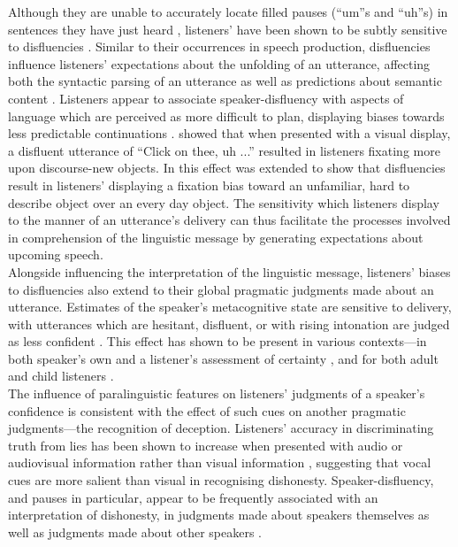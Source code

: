 \documentclass[man]{apa6}
\begin{document}
Although they are unable to accurately locate filled pauses (``um''s and ``uh''s) in sentences they have just heard \citep{Lickley1998}, listeners' have been shown to be subtly sensitive to disfluencies \citep{Ferreira2004a, Arnold2003, Barr2001, Corley2011}. 
Similar to their occurrences in speech production, disfluencies influence listeners' expectations about the unfolding of an utterance, affecting both the syntactic parsing of an utterance \citep{Ferreira2004a, Lau2005} as well as predictions about semantic content \citep{Barr2001, Arnold2003, Arnold2004}. 
Listeners appear to associate speaker-disfluency with aspects of language which are perceived as more difficult to plan, displaying biases towards less predictable continuations \citep{Corley2007}. 
\citet{Arnold2004} showed that when presented with a visual display, a disfluent utterance of ``Click on thee, uh ...'' resulted in listeners fixating more upon discourse-new objects. 
In \citet{Arnold2007} this effect was extended to show that disfluencies result in listeners' displaying a fixation bias toward an unfamiliar, hard to describe object over an every day object. 
The sensitivity which listeners display to the manner of an utterance's delivery can thus facilitate the processes involved in comprehension of the linguistic message by generating expectations about upcoming speech.\\

Alongside influencing the interpretation of the linguistic message, listeners' biases to disfluencies also extend to their global pragmatic judgments made about an utterance. 
Estimates of the speaker's metacognitive state are sensitive to delivery, with utterances which are hesitant, disfluent, or with rising intonation are judged as less confident \citep{Smith1993, Brennan1995}. 
This effect has shown to be present in various contexts---in both speaker's own and a listener's assessment of certainty \citep{Swerts2005}, and for both adult and child listeners \citep{Krahmer2005}.\\

The influence of paralinguistic features on listeners' judgments of a speaker's confidence is consistent with the effect of such cues on another pragmatic judgments---the recognition of deception. 
Listeners' accuracy in discriminating truth from lies has been shown to increase when presented with audio or audiovisual information rather than visual information \citep{Bond2006}, suggesting that vocal cues are more salient than visual in recognising dishonesty. 
Speaker-disfluency, and pauses in particular, appear to be frequently associated with an interpretation of dishonesty, in judgments made about speakers themselves as well as judgments made about other speakers \citep{Zuckerman1981}. \\
\end{document}
